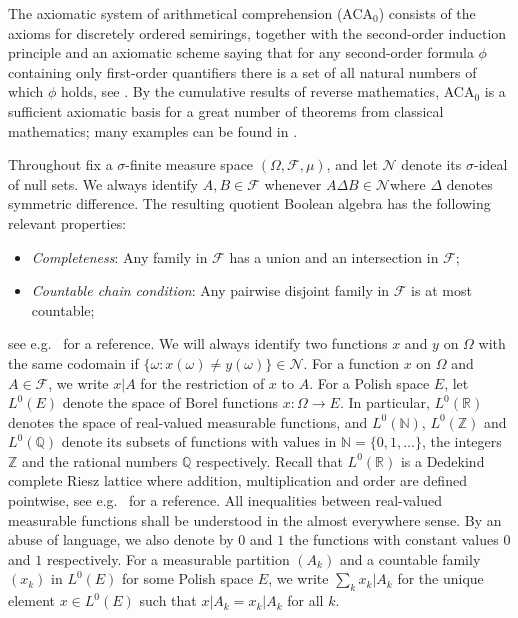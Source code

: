 \documentclass{jloganal}
\numberwithin{equation}{section}
\theoremstyle{plain}
\newcommand\F{\mathcal{F}}
\begin{document}
The axiomatic system of arithmetical comprehension (ACA$_{0}$) consists of the axioms for discretely ordered semirings, together with the second-order induction principle and
an axiomatic scheme saying that for any second-order formula $\phi$ containing only first-order quantifiers there is a set of all natural numbers of which $\phi$ holds, see \cite{simpson2009subsystems}. 
By the cumulative results of reverse mathematics, ACA$_{0}$ is a sufficient axiomatic basis for a great number of theorems from classical mathematics; many examples can be found in \cite{simpson2009subsystems}.

Throughout fix a $\sigma$-finite measure space $(\Omega,\mathcal{F},\mu)$, and let $\mathcal{N}$ denote its $\sigma$-ideal of null sets. 
We always identify $A,B\in\mathcal{F}$ whenever $A\Delta B\in \mathcal{N}$where $\Delta$ denotes symmetric difference.  
The resulting quotient Boolean algebra has the following relevant properties: 
\begin{itemize}
\item \emph{Completeness}: Any family in $\mathcal{F}$ has a union and an intersection in $\mathcal{F}$; 
\item \emph{Countable chain condition}: Any pairwise disjoint family in $\mathcal{F}$ is at most countable;  
\end{itemize}
see e.g.~\cite[Chapter 31]{halmos09} for a reference. 
We will always identify two functions $x$ and $y$ on $\Omega$ with the same codomain if $\{\omega : x(\omega)\neq y(\omega)\}\in\mathcal{N}$.  
For a function $x$ on $\Omega$ and $A\in \F$, we write $x|A$ for the restriction of $x$ to $A$. 
For a Polish space $E$, let $L^0(E)$ denote the space of Borel functions $x\colon \Omega\to E$. 
In particular, $L^0(\mathbb{R})$ denotes the space of real-valued measurable functions, and $L^0(\mathbb{N})$, $L^0(\mathbb{Z})$ and $L^0(\mathbb{Q})$ denote its subsets of functions with values in $\mathbb{N}=\{0,1,\ldots\}$, 
the integers $\mathbb{Z}$ and the rational numbers $\mathbb{Q}$ respectively.   
Recall that $L^0(\mathbb{R})$ is a Dedekind complete Riesz lattice where addition, multiplication and order are defined pointwise, see e.g.~\cite{fremlin1974topological} for a reference. 
All inequalities between real-valued measurable functions shall be  understood in the almost everywhere sense. 
By an abuse of language, we also denote by $0$ and $1$ the functions with constant values $0$ and $1$ respectively.     
For a measurable partition $(A_k)$ and  a countable family $(x_k)$ in $L^0(E)$ for some Polish space $E$, we write $\sum_k x_k|A_k$ for the unique element $x\in L^0(E)$ such that $x|A_k=x_k|A_k$ for all $k$.   
\end{document}
